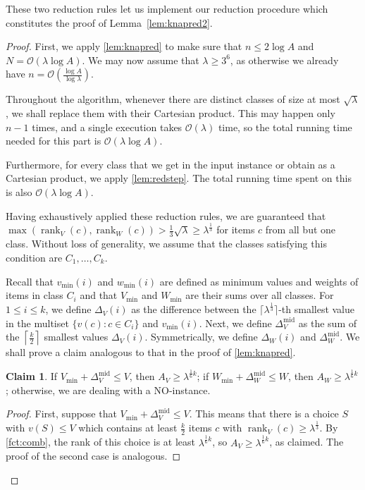 \documentclass{article}
\theoremstyle{plain}
\theoremstyle{definition}
\newtheorem*{claim}{Claim}
\newcommand{\ceil}[1]{\left\lceil #1 \right\rceil}
\newcommand{\Oh}{\mathcal{O}}
\newcommand{\mmid}{\mathrm{mid}}
\DeclareMathOperator*{\rank}{rank}
\begin{document}
   These two reduction rules let us implement our reduction procedure which constitutes the proof of Lemma~\ref{lem:knapred2}.
    \begin{proof}
    First, we apply \cref{lem:knapred} to make sure that $n\le 2\log A$ and $N = \Oh(\lambda \log A)$.
    We may now assume that $\lambda \ge 3^6$, as otherwise we already have $n = \Oh(\frac{\log A}{\log \lambda})$.
     
    Throughout the algorithm, whenever there are distinct classes of size at most $\sqrt{\lambda}$, 
    we shall replace them with their Cartesian product.
    This may happen only $n-1$ times, and a single execution takes $\Oh(\lambda)$ time,
    so the total running time needed for this part is $\Oh(\lambda \log A)$.
    
    Furthermore, for every class that we get in the input instance or obtain as a Cartesian product,
    we apply \cref{lem:redstep}.  The total running time spent on this is also $\Oh(\lambda \log A)$.
    
    Having exhaustively applied these reduction rules, we are guaranteed that
    $\max(\rank_V(c),\rank_W(c))>\frac13\sqrt{\lambda}\ge \lambda^{\frac13}$ for items $c$ from all but one class. 
    Without loss of generality, we assume that the classes satisfying this condition are $C_1,\ldots,C_k$.
    
    Recall that $v_{\min}(i)$ and $w_{\min}(i)$ are defined as minimum values and weights of items in class $C_i$
    and that $V_{\min}$ and $W_{\min}$ are their sums over all classes.
    For $1\le i \le k$, we define $\Delta_V(i)$ as the difference between the 
    $\big\lceil{\lambda^{\frac13}}\big\rceil$-th smallest value in the multiset  $\{v(c) : c\in C_i\}$ and $v_{\min}(i)$.
    Next, we define $\Delta_V^{\mmid}$ as the sum of the $\ceil{\frac{k}{2}}$ smallest values $\Delta_V(i)$.
    Symmetrically, we define $\Delta_W(i)$ and $\Delta_W^{\mmid}$.
    We shall prove a claim analogous to that in the proof of \cref{lem:knapred}.
    
    \begin{claim}
    If $V_{\min} + \Delta_V^{\mmid}\le V$, then $A_V \ge \lambda^{\frac16 k}$; if $W_{\min} + \Delta_W^{\mmid}\le W$, then $A_W \ge \lambda^{\frac16 k}$;  otherwise, we are dealing with a NO-instance. 
    \end{claim}
    \begin{proof}
    First, suppose that $V_{\min} + \Delta_V^{\mmid}\le V$.
    This means that there is a choice $S$ with $v(S)\le V$ 
    which contains at least $\frac{k}{2}$ items $c$ with $\rank_V(c)\ge \lambda^{\frac13}$. 
    By \cref{fct:comb}, the rank of this choice is at least $\lambda^{\frac16 k}$, so $A_V \ge \lambda^{\frac16 k}$, as claimed.
    The proof of the second case is analogous.
    

\end{proof}
\end{proof}
\end{document}

